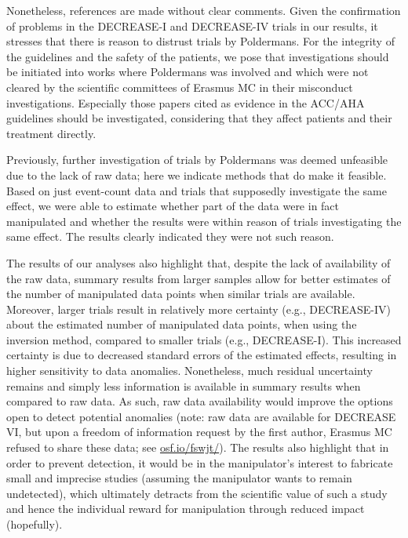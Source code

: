 \documentclass[]{article}
\begin{document}
Nonetheless, references are made without clear comments. Given the
confirmation of problems in the DECREASE-I and DECREASE-IV trials in our
results, it stresses that there is reason to distrust trials by
Poldermans. For the integrity of the guidelines and the safety of the
patients, we pose that investigations should be initiated into works
where Poldermans was involved and which were not cleared by the
scientific committees of Erasmus MC in their misconduct investigations.
Especially those papers cited as evidence in the ACC/AHA guidelines
should be investigated, considering that they affect patients and their
treatment directly.

Previously, further investigation of trials by Poldermans was deemed
unfeasible due to the lack of raw data; here we indicate methods that do
make it feasible. Based on just event-count data and trials that
supposedly investigate the same effect, we were able to estimate whether
part of the data were in fact manipulated and whether the results were
within reason of trials investigating the same effect. The results
clearly indicated they were not such reason.

The results of our analyses also highlight that, despite the lack of
availability of the raw data, summary results from larger samples allow
for better estimates of the number of manipulated data points when
similar trials are available. Moreover, larger trials result in
relatively more certainty (e.g., DECREASE-IV) about the estimated number
of manipulated data points, when using the inversion method, compared to
smaller trials (e.g., DECREASE-I). This increased certainty is due to
decreased standard errors of the estimated effects, resulting in higher
sensitivity to data anomalies. Nonetheless, much residual uncertainty
remains and simply less information is available in summary results when
compared to raw data. As such, raw data availability would improve the
options open to detect potential anomalies (note: raw data are available
for DECREASE VI, but upon a freedom of information request by the first
author, Erasmus MC refused to share these data; see
\href{https://osf.io/fswjt/}{osf.io/fswjt/}). The results also highlight
that in order to prevent detection, it would be in the manipulator's
interest to fabricate small and imprecise studies (assuming the
manipulator wants to remain undetected), which ultimately detracts from
the scientific value of such a study and hence the individual reward for
manipulation through reduced impact (hopefully).
\end{document}
